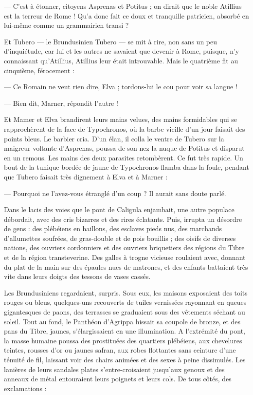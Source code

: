\documentclass[a4paper, 11pt, oneside, polutonikogreek, french]{article}
\begin{document}
--- C'est à étonner, citoyens Asprenas et Potitus ; on dirait que le noble Atillius est la terreur de Rome ! Qu'a donc fait ce doux et tranquille patricien, absorbé en lui-même comme un grammairien transi ?

Et Tubero --- le Brundusinien Tubero --- se mit à rire, non sans un peu d'inquiétude, car lui et les autres ne savaient que devenir à Rome, puisque, n'y connaissant qu'Atillius, Atillius leur était introuvable. Mais le quatrième fit au cinquième, férocement :

--- Ce Romain ne veut rien dire, Elva ; tordons-lui le cou pour voir sa langue !

--- Bien dit, Marner, répondit l'autre !

Et Mamer et Elva brandirent leurs mains velues, des mains formidables qui se rapprochèrent de la face de Typochronos, où la barbe vieille d'un jour faisait des points bleus. Le barbier cria. D'un élan, il colla le ventre de Tubero sur la maigreur voltante d'Asprenas, poussa de son nez la nuque de Potitus et disparut en un remous. Les mains des deux parasites retombèrent. Ce fut très rapide. Un bout de la tunique bordée de jaune de Typochronos flamba dans la foule, pendant que Tubero faisait très dignement à Elva et à Marner :

--- Pourquoi ne l'avez-vous étranglé d'un coup ? Il aurait sans doute parlé.

Dans le lacis des voies que le pont de Caligula enjambait, une autre populace débordait, avec des cris bizarres et des rires éclatants. Puis, irrupta un désordre de gens : des plébéiens en haillons, des esclaves pieds nus, des marchands d'allumettes soufrées, de gras-double et de pois bouillis ; des oisifs de diverses nations, des ouvriers cordonniers et des ouvriers briquetiers des régions du Tibre et de la région transteverine. Des galles à trogne vicieuse roulaient avec, donnant du plat de la main sur des épaules nues de matrones, et des enfants battaient très vite dans leurs doigts des tessons de vases cassés.

Les Brundusiniens regardaient, surpris. Sous eux, les maisons exposaient des toits rouges ou bleus, quelques-uns recouverts de tuiles vernissées rayonnant en queues gigantesques de paons, des terrasses se graduaient sous des vêtements séchant au soleil. Tout au fond, le Panthéon d’Agrippa hissait sa coupole de bronze, et des pans du Tibre, jaunes, s'élargissaient en une illumination. A l'extrémité du pont, la masse humaine poussa des prostituées des quartiers plébéiens, aux chevelures teintes, rousses d'or ou jaunes safran, aux robes flottantes sans ceinture d'une ténuité de fil, laissant voir des chairs animées et des sexes à peine dissimulés. Les lanières de leurs sandales plates s'entre-croisaient jusqu'aux genoux et des anneaux de métal entouraient leurs poignets et leurs cols. De tous côtés, des exclamations :
\end{document}
